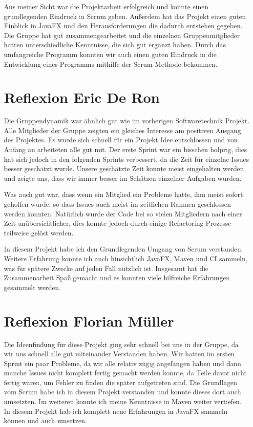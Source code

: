 Aus meiner Sicht war die Projektarbeit erfolgreich und konnte einen grundlegenden Eindruck in Scrum geben. Außerdem hat das Projekt einen guten Einblick in JavaFX und den Herausforderungen die dadurch entstehen gegeben. Die Gruppe hat gut zusammengearbeitet und die einzelnen Gruppenmitglieder hatten unterschiedliche Kenntnisse, die sich gut ergänzt haben. Durch das umfangreiche Programm konnten wir auch einen guten Eindruck in die Entwicklung eines Programms mithilfe der Scrum Methode bekommen.

\section{Reflexion Eric De Ron}

Die Gruppendynamik war ähnlich gut wie im vorherigen Softwaretechnik Projekt. Alle Mitglieder der Gruppe zeigten ein gleiches Interesse am positiven Ausgang des Projektes. Es wurde sich schnell für ein Projekt Idee entschlossen und von Anfang an arbeiteten alle gut mit. Der erste Sprint war ein bisschen holprig, dies hat sich jedoch in den folgenden Sprints verbessert, da die Zeit für einzelne Issues besser geschätzt wurde. Unsere geschätzte Zeit konnte meist eingehalten werden und zeigte uns, dass wir immer besser im Schätzen einzelner Aufgaben wurden.

Was auch gut war, dass wenn ein Mitglied ein Probleme hatte, ihm meist sofort geholfen wurde, so dass Issues auch meist im zeitlichen Rahmen geschlossen werden konnten. Natürlich wurde der Code bei so vielen Mitgliedern nach einer Zeit unübersichtlicher, dies konnte jedoch durch einige Refactoring-Prozesse teilweise gelöst werden.

In diesem Projekt habe ich den Grundlegenden Umgang von Scrum verstanden. Weitere Erfahrung konnte ich auch hinsichtlich JavaFX, Maven und CI sammeln, was für spätere Zwecke auf jeden Fall nützlich ist. Insgesamt hat die Zusammenarbeit Spaß gemacht und es konnten viele hilfreiche Erfahrungen gesammelt werden.

\section{Reflexion Florian Müller}

Die Ideenfindung für diese Projekt ging sehr schnell bei uns in der Gruppe, da wir uns schnell alle gut miteinander Verstanden haben. Wir hatten im ersten Sprint ein paar Probleme, da wir alle relativ zügig angefangen haben und dann manche Issues nicht komplett fertig gemacht werden konnte, da Teile davor nicht fertig waren, um Fehler zu finden die später aufgetreten sind.
Die Grundlagen vom Scrum habe ich in diesem Projekt verstanden und konnte dieses dort auch umsetzten. Im weiteren konnte ich meine Kenntnisse in Maven weiter vertiefen. In diesem Projekt hab ich komplett neue Erfahrungen in JavaFX sammeln können und auch umsetzen.


